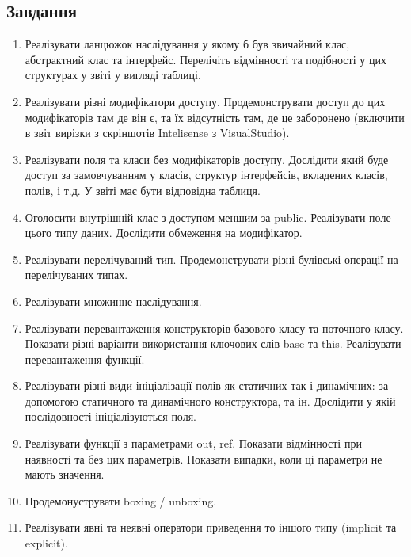 \documentclass[oneside,14pt]{extarticle}
\begin{document}
\begin{normalsize}
	\section*{Завдання}
	\begin{enumerate}
		\item Реалізувати ланцюжок наслідування у якому б був звичайний клас,
		абстрактний клас та інтерфейс. Перелічіть відмінності та подібності у цих
		структурах у звіті у вигляді таблиці.
		
		\item Реалізувати різні модифікатори доступу. Продемонструвати доступ до цих модифікаторів там де він є, та їх відсутність там, де це заборонено
		(включити в звіт вирізки з скріншотів Intelisense з VisualStudio).
		
		\item Реалізувати поля та класи без модифікаторів доступу. Дослідити який буде доступ	за замовчуванням у класів, структур інтерфейсів, вкладених класів, полів, і т.д. У	звіті має бути відповідна таблиця.
		
		\item Оголосити внутрішній клас з доступом меншим за public. Реалізувати поле цього	типу даних. Дослідити обмеження на модифікатор.
		
		\item Реалізувати перелічуваний тип. Продемонструвати різні булівські операції на перелічуваних типах.
		
		\item Реалізувати множинне наслідування.
		
		\item Реалізувати перевантаження конструкторів базового класу та поточного класу. Показати різні варіанти використання ключових слів base та this. Реалізувати	перевантаження функції.
		
		\item Реалізувати різні види ініціалізації полів як статичних так і динамічних: за	допомогою статичного та динамічного конструктора, та ін. Дослідити у якій послідовності ініціалізуються поля.
		
		\item Реалізувати функції з параметрами out, ref. Показати відмінності при наявності та без цих параметрів. Показати випадки, коли ці параметри не мають значення.
		
		\item Продемонуструвати boxing / unboxing.
		
		\item Реалізувати явні та неявні оператори приведення то іншого типу (implicit та explicit).
		

\end{enumerate}
\end{normalsize}
\end{document}
